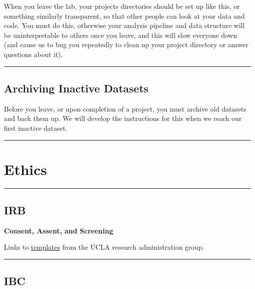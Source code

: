 \documentclass[]{book}
\begin{document}
When you leave the lab, your projects directories should be set up like this, or something similarly transparent, so that other people can look at your data and code. You must do this, otherwise your analysis pipeline and data structure will be uninterpretable to others once you leave, and this will slow everyone down (and cause us to bug you repeatedly to clean up your project directory or answer questions about it).

\begin{center}\rule{0.5\linewidth}{\linethickness}\end{center}

\hypertarget{archiving-inactive-datasets}{%
\subsection{Archiving Inactive Datasets}\label{archiving-inactive-datasets}}

Before you leave, or upon completion of a project, you must archive old datasets and back them up. We will develop the instructions for this when we reach our first inactive dataset.

\begin{center}\rule{0.5\linewidth}{\linethickness}\end{center}

\hypertarget{ethics}{%
\section{Ethics}\label{ethics}}

\begin{center}\rule{0.5\linewidth}{\linethickness}\end{center}

\hypertarget{irb}{%
\subsection{IRB}\label{irb}}

\textbf{Consent, Assent, and Screening}

Links to \href{https://ohrpp.research.ucla.edu/consent-templates/}{templates} from the UCLA research administration group.

\begin{center}\rule{0.5\linewidth}{\linethickness}\end{center}

\hypertarget{ibc}{%
\subsection{IBC}\label{ibc}}
\end{document}
